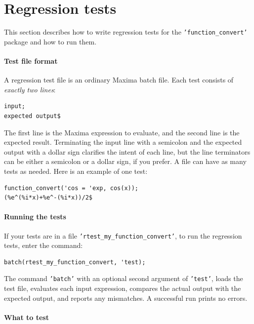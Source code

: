 \documentclass[12pt,fleqn]{extarticle}
\newcommand{\ttq}[1]{\texttt{'#1'}}
\newenvironment{maximabox}
  {\begin{tcolorbox}[
      breakable,
      enhanced,
      colback=white,
      colframe=black!8,
      boxrule=0pt,
      borderline west={2.2pt}{0pt}{black!25},
      arc=1pt,
      left=11pt,
      right=7pt,
      top=9pt,
      bottom=9pt,
      before skip=14pt,
      after skip=14pt
    ]}
  {\end{tcolorbox}}
\begin{document}
\section{Regression tests}

This section describes how to write regression tests for the \ttq{function\_convert} package 
and how to run them. 

\paragraph{Test file format} A regression test file is an ordinary Maxima batch file.  
Each test consists of \emph{exactly two lines}:
\begin{maximabox}
\begin{verbatim}
input;
expected output$
\end{verbatim}
\end{maximabox}
\noindent
The first line is the Maxima expression to evaluate, and the second line is the expected result.
Terminating the input line with a semicolon and the expected output with a dollar sign clarifies
the intent of each line, but the line terminators can be either a semicolon or a dollar sign, if you
prefer. A file can have as many tests as needed. Here is an example of one test:
\begin{maximabox}
\begin{verbatim}
function_convert('cos = 'exp, cos(x));
(%e^(%i*x)+%e^-(%i*x))/2$
\end{verbatim}
\end{maximabox}

\paragraph{Running the tests} If your tests are in a file \ttq{rtest\_my\_function\_convert}, to run the regression tests, enter the command:
\begin{maximabox}
\begin{verbatim}
batch(rtest_my_function_convert, 'test);
\end{verbatim}
\end{maximabox}
\noindent The command \ttq{batch} with an optional second argument of \ttq{test}, loads the test file, evaluates each input expression, compares the actual output with the expected output, and reports any mismatches.   A successful run prints no errors.

\paragraph{What to test} 
\end{document}

